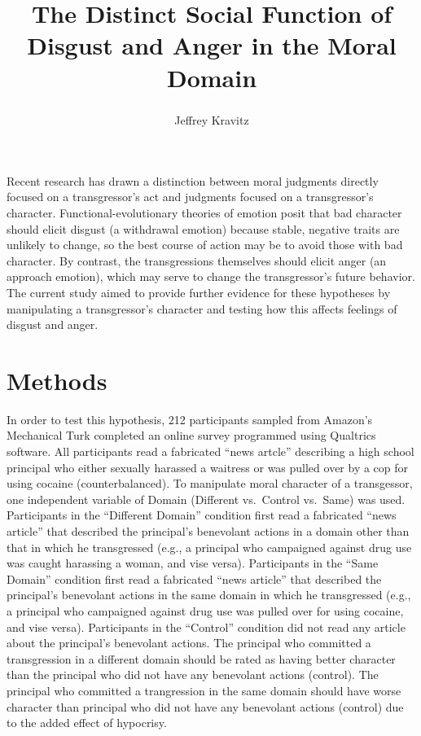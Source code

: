 \documentclass[man]{apa6}
\title{The Distinct Social Function of Disgust and Anger in the Moral Domain}
\author{Jeffrey Kravitz\textsuperscript{ }}
\date{}
\affiliation{
\vspace{0.5cm}
\textsuperscript{ } CUNY Brooklyn College}
\begin{document}
\maketitle

Recent research has drawn a distinction between moral judgments directly
focused on a transgressor's act and judgments focused on a
transgressor's character. Functional-evolutionary theories of emotion
posit that bad character should elicit disgust (a withdrawal emotion)
because stable, negative traits are unlikely to change, so the best
course of action may be to avoid those with bad character. By contrast,
the transgressions themselves should elicit anger (an approach emotion),
which may serve to change the transgressor's future behavior. The
current study aimed to provide further evidence for these hypotheses by
manipulating a transgressor's character and testing how this affects
feelings of disgust and anger.

\section{Methods}\label{methods}

In order to test this hypothesis, 212 participants sampled from Amazon's
Mechanical Turk completed an online survey programmed using Qualtrics
software. All participants read a fabricated \enquote{news artcle}
describing a high school principal who either sexually harassed a
waitress or was pulled over by a cop for using cocaine
(counterbalanced). To manipulate moral character of a transgessor, one
independent variable of Domain (Different vs.~Control vs.~Same) was
used. Participants in the \enquote{Different Domain} condition first
read a fabricated \enquote{news article} that described the principal's
benevolant actions in a domain other than that in which he transgressed
(e.g., a principal who campaigned against drug use was caught harassing
a woman, and vise versa). Participants in the \enquote{Same Domain}
condition first read a fabricated \enquote{news article} that described
the principal's benevolant actions in the same domain in which he
transgressed (e.g., a principal who campaigned against drug use was
pulled over for using cocaine, and vise versa). Participants in the
\enquote{Control} condition did not read any article about the
principal's benevolant actions. The principal who committed a
transgression in a different domain should be rated as having better
character than the principal who did not have any benevolant actions
(control). The principal who committed a trangression in the same domain
should have worse character than principal who did not have any
benevolant actions (control) due to the added effect of hypocrisy.
\end{document}
